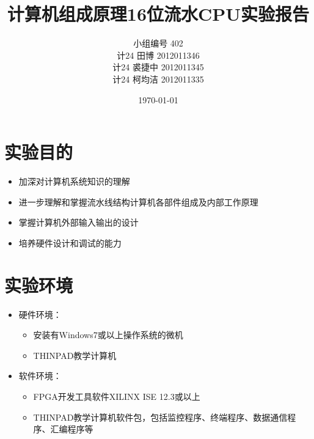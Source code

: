 \documentclass{article}
\title{计算机组成原理16位流水CPU实验报告
} %
\author{
小组编号 402\\
计24 田博 2012011346\\
计24 裘捷中 2012011345\\
计24 柯均洁 2012011335
} %
\date{\today} %
\begin{document}
\maketitle %

\setcounter{tocdepth}{3} %

\tableofcontents %



\section{实验目的}
\begin{itemize}
\item 加深对计算机系统知识的理解
\item 进一步理解和掌握流水线结构计算机各部件组成及内部工作原理
\item 掌握计算机外部输入输出的设计
\item 培养硬件设计和调试的能力
\end{itemize}

\section{实验环境}
\begin{itemize}
\item 硬件环境：
	\begin{itemize}
	\item 安装有Windows7或以上操作系统的微机
	\item THINPAD教学计算机
	\end{itemize}
\item 软件环境：
	\begin{itemize}
	\item FPGA开发工具软件XILINX ISE 12.3或以上
	\item THINPAD教学计算机软件包，包括监控程序、终端程序、数据通信程序、汇编程序等
	\end{itemize}
\end{itemize}
\end{document}
